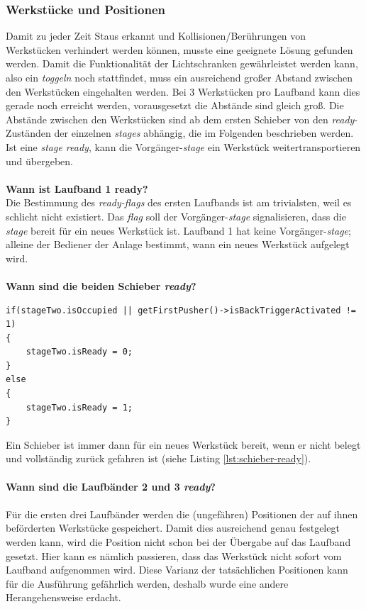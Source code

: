 \documentclass[fontsize=11pt,a4paper,final]{scrartcl}[2003/01/01]
\begin{document}
\subsubsection{Werkstücke und Positionen}
Damit zu jeder Zeit Staus erkannt und Kollisionen/Berührungen von Werkstücken verhindert werden können, musste eine geeignete Lösung gefunden werden. Damit die Funktionalität der Lichtschranken gewährleistet werden kann, also ein \textit{toggeln} noch stattfindet, muss ein ausreichend großer Abstand zwischen den Werkstücken eingehalten werden. Bei 3 Werkstücken pro Laufband kann dies gerade noch erreicht werden, vorausgesetzt die Abstände sind gleich groß. Die Abstände zwischen den Werkstücken sind ab dem ersten Schieber von den \textit{ready}-Zuständen der einzelnen \textit{stages} abhängig, die im Folgenden beschrieben werden. Ist eine \textit{stage ready}, kann die Vorgänger-\textit{stage} ein Werkstück weitertransportieren und übergeben. \\ \\
\textbf{Wann ist Laufband 1 ready?} \\
Die Bestimmung des \textit{ready-flags} des ersten Laufbands ist am trivialsten, weil es schlicht nicht existiert. Das \textit{flag} soll der Vorgänger-\textit{stage} signalisieren, dass die \textit{stage} bereit für ein neues Werkstück ist. Laufband 1 hat keine Vorgänger-\textit{stage}; alleine der Bediener der Anlage bestimmt, wann ein neues Werkstück aufgelegt wird. \\ \\
\textbf{Wann sind die beiden Schieber \textit{ready}?}
\begin{lstlisting}[caption={Beispiel: \textit{ready-flag} des ersten Schiebers},label={lst:schieber-ready}]
if(stageTwo.isOccupied || getFirstPusher()->isBackTriggerActivated != 1)
{
   	stageTwo.isReady = 0;
}
else
{
   	stageTwo.isReady = 1;
}
\end{lstlisting} 
Ein Schieber ist immer dann für ein neues Werkstück bereit, wenn er nicht belegt und vollständig zurück gefahren ist (siehe Listing \ref{lst:schieber-ready}). \\ \\
\textbf{Wann sind die Laufbänder 2 und 3 \textit{ready}?} \\ \\
Für die ersten drei Laufbänder werden die (ungefähren) Positionen der auf ihnen beförderten Werkstücke gespeichert. Damit dies ausreichend genau festgelegt werden kann, wird die Position nicht schon bei der Übergabe auf das Laufband gesetzt. Hier kann es nämlich passieren, dass das Werkstück nicht sofort vom Laufband aufgenommen wird. Diese Varianz der tatsächlichen Positionen kann für die Ausführung gefährlich werden, deshalb wurde eine andere Herangehensweise erdacht.
\end{document}
